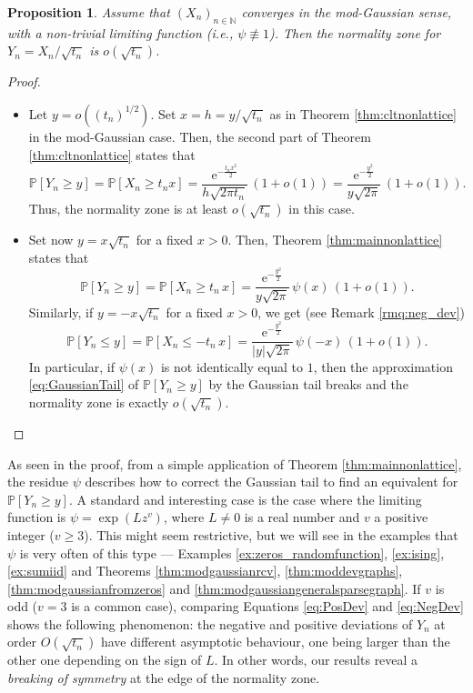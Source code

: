 \documentclass[12pt,a4paper,reqno]{amsart}
\newtheorem{proposition}[lemma]{Proposition}
\theoremstyle{remark}
\newcommand{\N}{\mathbb{N}}
\newcommand{\E}{\mathrm{e}}
\newcommand{\proba}{\mathbb{P}}
\begin{document}
\begin{proposition}
    \label{prop:normalityzone}
    Assume that $(X_n)_{n \in \N}$ converges in the mod-Gaussian sense, with a non-trivial limiting function ({\em i.e.}, $\psi \not\equiv 1$). Then the normality zone for $Y_n=X_n/\sqrt{t_n}$ is $o(\sqrt{t_n})$.
\end{proposition}
\begin{proof}
\begin{itemize}
    \item Let $y=o((t_n)^{1/2})$. Set $x=h=y/\sqrt{t_n}$ as in Theorem \ref{thm:cltnonlattice} in the mod-Gaussian case. Then, the second part of Theorem \ref{thm:cltnonlattice} states that
        $$\proba[Y_n \geq y] =\proba[X_n \geq t_n x] = \frac{\E^{-\frac{ t_n x^2}{2}}}{h \sqrt{2\pi t_n}}\,(1+o(1)) = \frac{\E^{-\frac{y^2}{2}}}{y \sqrt{2\pi}}\,(1+o(1)).$$
        Thus, the normality zone is at least $o(\sqrt{t_n})$ in this case.\vspace{2mm}
    \item Set now $y=x \sqrt{t_n}$ for a fixed $x > 0$. Then, Theorem \ref{thm:mainnonlattice} states that
        \begin{equation}
            \proba[Y_n \geq y] = \proba[X_n \geq t_n\, x]= \frac{\E^{-\frac{y^2}{2} }}{y \sqrt{2\pi}}\, \psi(x)\, (1+o(1)).
            \label{eq:PosDev}
        \end{equation}
        Similarly, if $y=-x \sqrt{t_n}$ for a fixed $x > 0$, we get (see Remark \ref{rmq:neg_dev})
        \begin{equation}
            \proba[Y_n \leq y] = \proba[X_n \leq - t_n\, x] =\frac{\E^{-\frac{y^2}{2} }}{|y| \sqrt{2\pi}}\, \psi(-x)\, (1+o(1)).
            \label{eq:NegDev}
        \end{equation}
        In particular, if $\psi(x)$ is not identically equal to $1$, then the approximation \eqref{eq:GaussianTail} of $\proba[Y_n \geq y]$ by the Gaussian tail breaks and the normality zone is exactly $o(\sqrt{t_n})$.\qedhere
\end{itemize}
\end{proof}
As seen in the proof, from a simple application of Theorem \ref{thm:mainnonlattice},
the residue $\psi$ describes how to correct the Gaussian tail to find an equivalent for $\proba[Y_n \geq y]$. A standard and interesting case is the case where the limiting function is $\psi=\exp(L z^v)$, where $L \neq 0$ is a real number and $v$ a positive integer ($v \geq 3$).
This might seem restrictive, but we will see in the examples that $\psi$ is very often of this type
--- Examples \ref{ex:zeros_randomfunction}, \ref{ex:ising}, \ref{ex:sumiid} and Theorems \ref{thm:modgaussianrcv}, \ref{thm:moddevgraphs}, \ref{thm:modgaussianfromzeros} and \ref{thm:modgaussiangeneralsparsegraph}.
If $v$ is odd ($v=3$ is a common case), comparing Equations \eqref{eq:PosDev} and \eqref{eq:NegDev} shows the following phenomenon:
the negative and positive deviations of $Y_n$ at order $O(\sqrt{t_n})$ have different asymptotic behaviour,
one being larger than the other one depending on the sign of $L$. 
In other words, our results reveal a {\em breaking of symmetry} at the edge of the normality zone.
\end{document}
